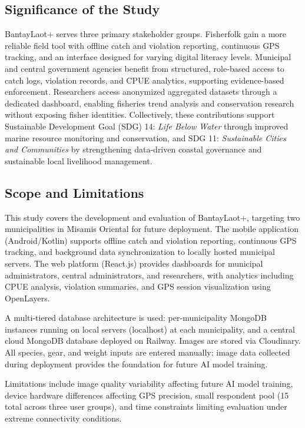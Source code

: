 \documentclass[journal]{IEEEtran}
\begin{document}
\subsection{Significance of the Study}

BantayLaot+ serves three primary stakeholder groups. Fisherfolk gain a more reliable
field tool with offline catch and violation reporting, continuous GPS tracking, and an
interface designed for varying digital literacy levels. Municipal and central government
agencies benefit from structured, role-based access to catch logs, violation records, and
CPUE analytics, supporting evidence-based enforcement. Researchers access anonymized
aggregated datasets through a dedicated dashboard, enabling fisheries trend analysis and
conservation research without exposing fisher identities. Collectively, these contributions
support Sustainable Development Goal (SDG) 14: \textit{Life Below Water} through improved
marine resource monitoring and conservation, and SDG 11: \textit{Sustainable Cities and
Communities} by strengthening data-driven coastal governance and sustainable local
livelihood management.

\subsection{Scope and Limitations}

This study covers the development and evaluation of BantayLaot+, targeting two
municipalities in Misamis Oriental for future deployment. The mobile application (Android/Kotlin) supports offline catch
and violation reporting, continuous GPS tracking, and background data synchronization to
locally hosted municipal servers. The web platform (React.js) provides dashboards for municipal administrators, central
administrators, and researchers, with analytics including CPUE analysis, violation
summaries, and GPS session visualization using OpenLayers.

A multi-tiered database architecture is used: per-municipality MongoDB instances running
on local servers (localhost) at each municipality, and a central cloud MongoDB database
deployed on Railway. Images are stored via Cloudinary. All species, gear, and weight
inputs are entered manually; image data collected during deployment provides the
foundation for future AI model training.

Limitations include image quality variability affecting future AI model training, device
hardware differences affecting GPS precision, small respondent pool (15 total across
three user groups), and time constraints limiting evaluation under extreme connectivity
conditions.
\end{document}
